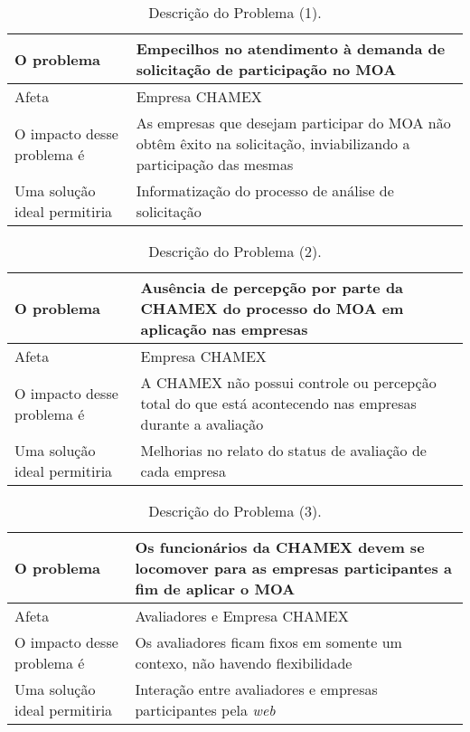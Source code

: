 \begin{table}[H]
	\centering
	\begin{tabular}{|p{6cm}|p{9cm}|}
	\hline
	O problema & Empecilhos no atendimento à demanda de solicitação de participação no MOA \\ \hline
	Afeta & Empresa CHAMEX \\ \hline
	O impacto desse problema é & As empresas que desejam participar do MOA não obtêm êxito na solicitação, inviabilizando a participação das mesmas \\ \hline
	Uma solução ideal permitiria & Informatização do processo de análise de solicitação \\ \hline
	\end{tabular}
	\label{tab:problemaUm}
	\caption[Descrição do Problema (1)]{Descrição do Problema (1).}
\end{table}
\begin{table}[H]
	\centering
	\begin{tabular}{|p{6cm}|p{9cm}|}
	\hline
	O problema & Ausência de percepção por parte da CHAMEX do processo do MOA em aplicação nas empresas \\ \hline
	Afeta & Empresa CHAMEX \\ \hline
	O impacto desse problema é & A CHAMEX não possui controle ou percepção total do que está acontecendo nas empresas durante a avaliação \\ \hline
	Uma solução ideal permitiria & Melhorias no relato do status de avaliação de cada empresa \\ \hline
	\end{tabular}
	\label{tab:problemaDois}
	\caption[Descrição do Problema (2)]{Descrição do Problema (2).}
\end{table}
\begin{table}[H]
	\centering
	\begin{tabular}{|p{6cm}|p{9cm}|}
	\hline
	O problema & Os funcionários da CHAMEX devem se locomover para as empresas participantes a fim de aplicar o MOA \\ \hline
	Afeta & Avaliadores e Empresa CHAMEX \\ \hline
	O impacto desse problema é & Os avaliadores ficam fixos em somente um contexo, não havendo flexibilidade \\ \hline
	Uma solução ideal permitiria & Interação entre avaliadores e empresas participantes pela \emph{web} \\ \hline
	\end{tabular}
	\label{tab:problemaTres}
	\caption[Descrição do Problema (3)]{Descrição do Problema (3).}
\end{table}
